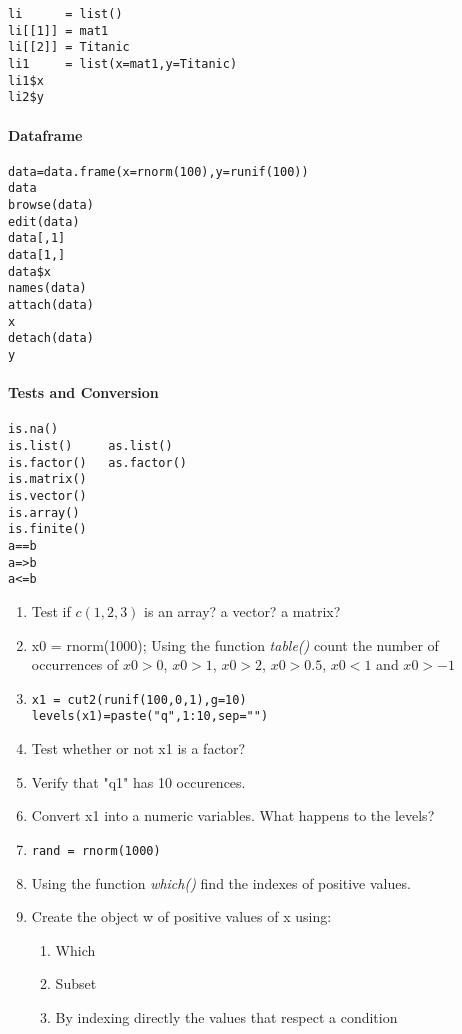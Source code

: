 \documentclass[11pt,a4paper]{article}
\newcommand{\1}{\mathbb{1}}
\begin{document}
\begin{verbatim}
li      = list()
li[[1]] = mat1
li[[2]] = Titanic
li1     = list(x=mat1,y=Titanic)
li1$x
li2$y
\end{verbatim}

\paragraph{Dataframe}

\begin{verbatim}
data=data.frame(x=rnorm(100),y=runif(100))
data
browse(data)
edit(data)
data[,1]
data[1,]
data$x
names(data)
attach(data)
x
detach(data)
y
\end{verbatim}

\paragraph{Tests and Conversion}

\begin{verbatim}
is.na()
is.list()     as.list()
is.factor()   as.factor()	  
is.matrix()   
is.vector()
is.array()
is.finite()
a==b
a=>b
a<=b
\end{verbatim}

\begin{Exercise}[title = Tests and indexing]
\begin{enumerate}
\item Test if $c(1,2,3)$ is an array? a vector? a matrix?  
\item x0 = rnorm(1000); Using the function \emph{table()} count the number of occurrences of $x0>0$, $x0>1$, $x0>2$, $x0>0.5$, $x0<1$ and $x0>-1$
\item \begin{verbatim}
x1 = cut2(runif(100,0,1),g=10) 
levels(x1)=paste("q",1:10,sep="")
\end{verbatim}
\item Test whether or not x1 is a factor?
\item Verify that "q1" has 10 occurences.
\item Convert x1 into a numeric variables. What happens to the levels?
\item \begin{verbatim}
rand = rnorm(1000)
\end{verbatim}
\item Using the function \emph{which()} find the indexes of positive values.
\item Create the object w of positive values of x using:
\begin{enumerate}
 \item Which
 \item Subset
 \item By indexing directly the values that respect a condition 
 \end{enumerate} 
\end{enumerate}
\end{Exercise}
\end{document}
